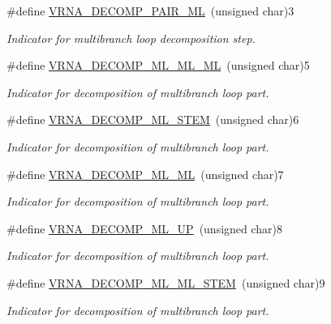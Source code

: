 \begin{DoxyCompactItemize}
\#define \hyperlink{group__constraints_gaa15b1185673f0b9e900c4748d45f388f}{V\+R\+N\+A\+\_\+\+D\+E\+C\+O\+M\+P\+\_\+\+P\+A\+I\+R\+\_\+\+ML}~(unsigned char)3
\begin{DoxyCompactList}\small\item\em Indicator for multibranch loop decomposition step. \end{DoxyCompactList}\item 
\#define \hyperlink{group__constraints_ga735517266f2e35e1374b8f1ea77ef23e}{V\+R\+N\+A\+\_\+\+D\+E\+C\+O\+M\+P\+\_\+\+M\+L\+\_\+\+M\+L\+\_\+\+ML}~(unsigned char)5
\begin{DoxyCompactList}\small\item\em Indicator for decomposition of multibranch loop part. \end{DoxyCompactList}\item 
\#define \hyperlink{group__constraints_ga4a23054c75d8efc785de50e3ea87602f}{V\+R\+N\+A\+\_\+\+D\+E\+C\+O\+M\+P\+\_\+\+M\+L\+\_\+\+S\+T\+EM}~(unsigned char)6
\begin{DoxyCompactList}\small\item\em Indicator for decomposition of multibranch loop part. \end{DoxyCompactList}\item 
\#define \hyperlink{group__constraints_ga7f4cb9ff7a33e67f0539bd39e7b19a78}{V\+R\+N\+A\+\_\+\+D\+E\+C\+O\+M\+P\+\_\+\+M\+L\+\_\+\+ML}~(unsigned char)7
\begin{DoxyCompactList}\small\item\em Indicator for decomposition of multibranch loop part. \end{DoxyCompactList}\item 
\#define \hyperlink{group__constraints_gae6478dda14e50e2f2cb9ef333a29256e}{V\+R\+N\+A\+\_\+\+D\+E\+C\+O\+M\+P\+\_\+\+M\+L\+\_\+\+UP}~(unsigned char)8
\begin{DoxyCompactList}\small\item\em Indicator for decomposition of multibranch loop part. \end{DoxyCompactList}\item 
\#define \hyperlink{group__constraints_ga63d8ceb8c96ae3b463e529e28cc0fe98}{V\+R\+N\+A\+\_\+\+D\+E\+C\+O\+M\+P\+\_\+\+M\+L\+\_\+\+M\+L\+\_\+\+S\+T\+EM}~(unsigned char)9
\begin{DoxyCompactList}\small\item\em Indicator for decomposition of multibranch loop part. \end{DoxyCompactList}\item 

\end{DoxyCompactItemize}
